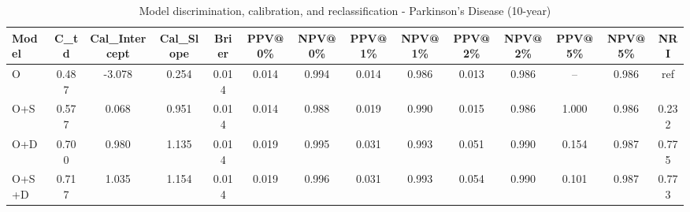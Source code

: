 \begin{table}[htbp]
\centering
\small
\caption{Model discrimination, calibration, and reclassification - Parkinson's Disease (10-year)}
\label{tab:perf_pd_10y}
\begin{tabular}{lccccccccccccc}
\toprule
Model & C\_td & Cal\_Intercept & Cal\_Slope & Brier & PPV@0\% & NPV@0\% & PPV@1\% & NPV@1\% & PPV@2\% & NPV@2\% & PPV@5\% & NPV@5\% & NRI \\
\midrule
O & 0.487 & -3.078 & 0.254 & 0.014 & 0.014 & 0.994 & 0.014 & 0.986 & 0.013 & 0.986 & -- & 0.986 & ref \\
O+S & 0.577 & 0.068 & 0.951 & 0.014 & 0.014 & 0.988 & 0.019 & 0.990 & 0.015 & 0.986 & 1.000 & 0.986 & 0.232 \\
O+D & 0.700 & 0.980 & 1.135 & 0.014 & 0.019 & 0.995 & 0.031 & 0.993 & 0.051 & 0.990 & 0.154 & 0.987 & 0.775 \\
O+S+D & 0.717 & 1.035 & 1.154 & 0.014 & 0.019 & 0.996 & 0.031 & 0.993 & 0.054 & 0.990 & 0.101 & 0.987 & 0.773 \\
\bottomrule
\end{tabular}
\end{table}